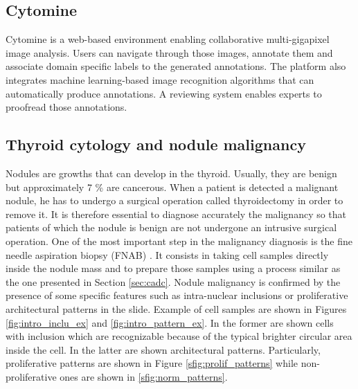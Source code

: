 \subsection{Cytomine} 
\label{sssec:detect_cytomine}
Cytomine \cite{maree2016collaborative} is a web-based environment enabling collaborative multi-gigapixel image analysis. Users can navigate through those images, annotate them and associate domain specific labels to the generated annotations. The platform also integrates machine learning-based image recognition algorithms that can automatically produce annotations. A reviewing system enables experts to proofread those annotations. 

\subsection{Thyroid cytology and nodule malignancy}
\label{ssec:intro_thyroid_case}
Nodules are growths that can develop in the thyroid. Usually, they are benign but approximately 7 \% are cancerous\cite{gopinath2013computer}. When a patient is detected a malignant nodule, he has to undergo a surgical operation called thyroidectomy in order to remove it. It is therefore essential to diagnose accurately the malignancy so that patients of which the nodule is benign are not undergone an intrusive surgical operation. One of the most important step in the malignancy diagnosis is the fine needle aspiration biopsy (FNAB) \cite{bomeli2010evaluation}. It consists in taking cell samples directly inside the nodule mass and to prepare those samples using a process similar as the one presented in Section \ref{sec:cadc}. Nodule malignancy is confirmed by the presence of some specific features such as intra-nuclear inclusions or proliferative architectural patterns in the slide. Example of cell samples are shown in Figures \ref{fig:intro_inclu_ex} and \ref{fig:intro_pattern_ex}. In the former are shown cells with inclusion which are recognizable because of the typical brighter circular area inside the cell. In the latter are shown architectural patterns. Particularly, proliferative patterns are shown in Figure \ref{sfig:prolif_patterns} while non-proliferative ones are shown in \ref{sfig:norm_patterns}. 

